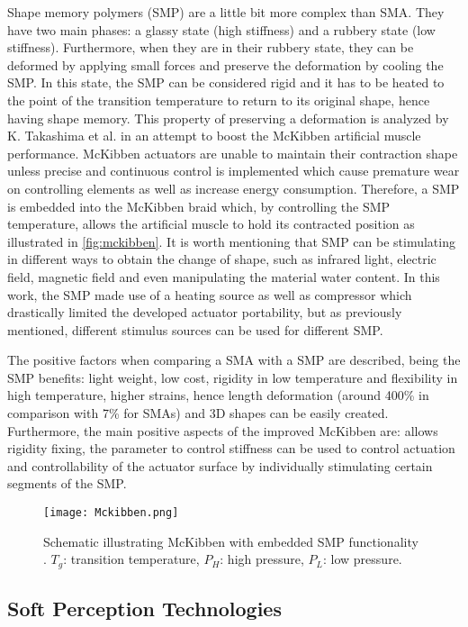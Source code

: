 Shape memory polymers (SMP) are a little bit more complex than SMA. They have two main phases: a glassy state (high stiffness) and a rubbery state (low stiffness). Furthermore, when they are in their rubbery state, they can be deformed by applying small forces and preserve the deformation by cooling the SMP. In this state, the SMP can be considered rigid and it has to be heated to the point of the transition temperature to return to its original shape, hence having shape memory. This property of preserving a deformation is analyzed by K. Takashima et al. \cite{Takashima2010} in an attempt to boost the McKibben artificial muscle performance. McKibben actuators are unable to maintain their contraction shape unless precise and continuous control is implemented which cause premature wear on controlling elements as well as increase energy consumption. Therefore, a SMP is embedded into the McKibben braid which, by controlling the SMP temperature, allows the artificial muscle to hold its contracted position as illustrated in \autoref{fig:mckibben}. It is worth mentioning that SMP can be stimulating in different ways to obtain the change of shape, such as infrared light, electric field, magnetic field and even manipulating the material water content. In this work, the SMP made use of a heating source as well as compressor which drastically limited the developed actuator portability, but as previously mentioned, different stimulus sources can be used for different SMP.

The positive factors when comparing a SMA with a SMP are described, being the SMP benefits: light weight, low cost, rigidity in low temperature and flexibility in high temperature, higher strains, hence length deformation (around 400\% in comparison with 7\% for SMAs) and 3D shapes can be easily created. Furthermore, the main positive aspects of the improved McKibben are: allows rigidity fixing, the parameter to control stiffness can be used to control actuation and controllability of the actuator surface by individually stimulating certain segments of the SMP.

\begin{figure}[hbtp!]
    \centering
    \texttt{[image: Mckibben.png]}
    \caption{Schematic illustrating McKibben with embedded SMP functionality \cite{Takashima2010}. $T_g$: transition temperature, $P_H$: high pressure, $P_L$: low pressure. }
    \label{fig:mckibben}
\end{figure}

\subsection{Soft Perception Technologies}
